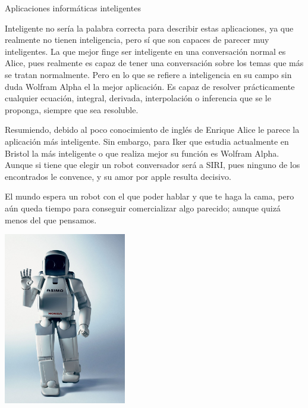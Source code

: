 \documentclass[spanish, a4paper, 12pt]{article} 	%
\begin{document}
	\newpage
\begin{section}{Aplicaciones informáticas inteligentes}

	Inteligente no sería la palabra correcta para describir estas aplicaciones, ya que realmente no tienen inteligencia, pero sí que son capaces de parecer muy inteligentes. La que mejor finge ser inteligente en una conversación normal es Alice, pues realmente es capaz de tener una conversación sobre los temas que más se tratan normalmente. Pero en lo que se refiere a inteligencia en su campo sin duda Wolfram Alpha el la mejor aplicación. Es capaz de resolver prácticamente cualquier ecuación, integral, derivada, interpolación o inferencia que se le proponga, siempre que sea resoluble. 
	
	Resumiendo, debido al poco conocimiento de inglés de Enrique Alice le parece la aplicación más inteligente. Sin embargo, para Iker que estudia actualmente en Bristol la más inteligente o que realiza mejor su función es Wolfram Alpha. Aunque si tiene que elegir un robot conversador será a SIRI, pues ninguno de los encontrados le convence, y su amor por apple resulta decisivo.
	
	El mundo espera un robot con el que poder hablar y que te haga la cama, pero aún queda  tiempo para conseguir comercializar algo parecido; aunque quizá menos del que pensamos.
		\begin{center}
		\includegraphics[width=0.4\textwidth]{asimoHonda2.png}
		\end{center}
	
\end{section}
\end{document}
